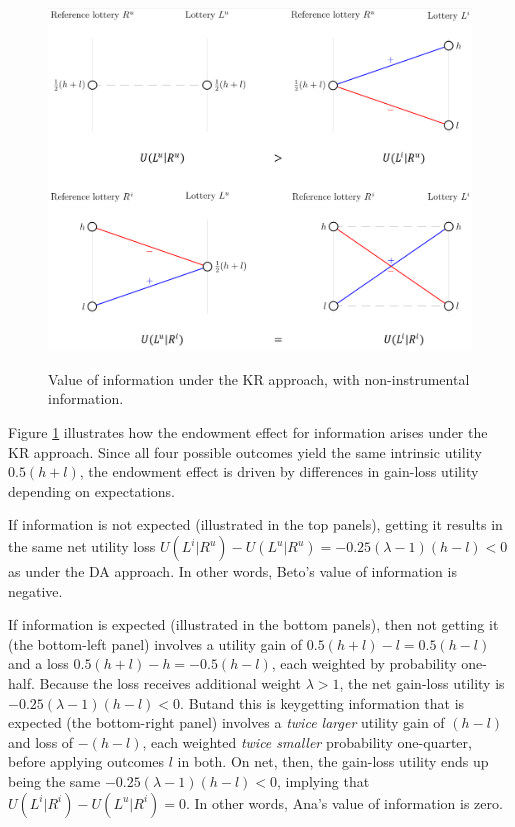 \documentclass[12pt]{article}
\begin{document}
\begin{figure}[ht]
  \caption{Value of information under the KR approach, with non-instrumental information.}\label{fig:nonInstrumental-KR}
  \begin{center}
  {\includegraphics[width=1\textwidth]{./figures/theory_fig2.png}}
  \end{center}
\end{figure}

Figure \ref{fig:nonInstrumental-KR} illustrates how the endowment effect for information arises under the KR approach. Since all four possible outcomes yield the same intrinsic utility $0.5(h+l)$, the endowment effect is driven by differences in gain-loss utility depending on expectations.

If information is not expected (illustrated in the top panels), getting it results in the same net utility loss $U(L^i|R^u)-U(L^u|R^u)=-0.25(\lambda-1)(h-l)<0$ as under the DA approach. In other words, Beto's value of information is negative.

If information is expected (illustrated in the bottom panels), then not getting it (the bottom-left panel) involves a utility gain of $0.5(h+l)-l=0.5(h-l)$ and a loss $0.5(h+l)-h=-0.5(h-l)$, each weighted by probability one-half. Because the loss receives additional weight $\lambda>1$, the net gain-loss utility is $-0.25(\lambda-1)(h-l)<0$. But\textemdash and this is key\textemdash getting information that is expected (the bottom-right panel) involves a \emph{twice larger} utility gain of $(h-l)$ and loss of $-(h-l)$, each weighted \emph{twice smaller} probability one-quarter, before applying outcomes $l$ in both. On net, then, the gain-loss utility ends up being the same $-0.25(\lambda-1)(h-l)<0$, implying that $U(L^i|R^i)-U(L^u|R^i)=0$. In other words, Ana's value of information is zero.
\end{document}
